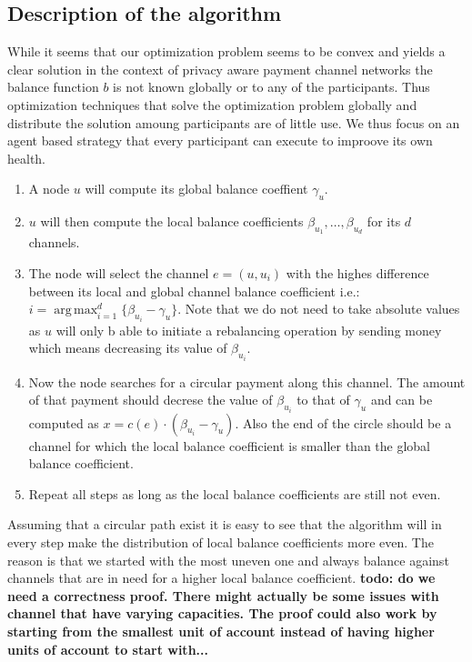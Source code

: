 \documentclass[a4paper]{paper}
\DeclareMathOperator*{\argmax}{arg\,max}
\begin{document}
\subsection{Description of the algorithm}
While it seems that our optimization problem seems to be convex and yields a clear solution in the context of privacy aware payment channel networks the balance function $b$ is not known globally or to any of the participants.
Thus optimization techniques that solve the optimization problem globally and distribute the solution amoung participants are of little use.
We thus focus on an agent based strategy that every participant can execute to improove its own health.
\begin{enumerate}
\item A node $u$ will compute its global balance coeffient $\gamma_u$.
\item $u$ will then compute the local balance coefficients $\beta_{u_1},\dots,\beta_{u_d}$ for its $d$ channels.
\item The node will select the channel $e=(u,u_i)$ with the highes difference between its local and global channel balance coefficient i.e.: $i = \displaystyle{\argmax_{i=1}^d\{\beta_{u_i} - \gamma_u\}}$. Note that we do not need to take absolute values as $u$ will only b able to initiate a rebalancing operation by sending money which means decreasing its value of $\beta_{u_i}$.
\item Now the node searches for a circular payment along this channel. The amount of that payment should decrese the value of $\beta_{u_i}$ to that of $\gamma_u$ and can be computed as $x = c(e)\cdot (\beta_{u_i}-\gamma_u)$. Also the end of the circle should be a channel for which the local balance coefficient is smaller than the global balance coefficient. 
 \item Repeat all steps as long as the local balance coefficients are still not even.
\end{enumerate}

Assuming that a circular path exist it is easy to see that the algorithm will in every step make the distribution of local balance coefficients more even.
The reason is that we started with the most uneven one and always balance against channels that are in need for a higher local balance coefficient.
\textbf{todo: do we need a correctness proof. There might actually be some issues with channel that have varying capacities. The proof could also work by starting from the smallest unit of account instead of having higher units of account to start with...}
\end{document}
